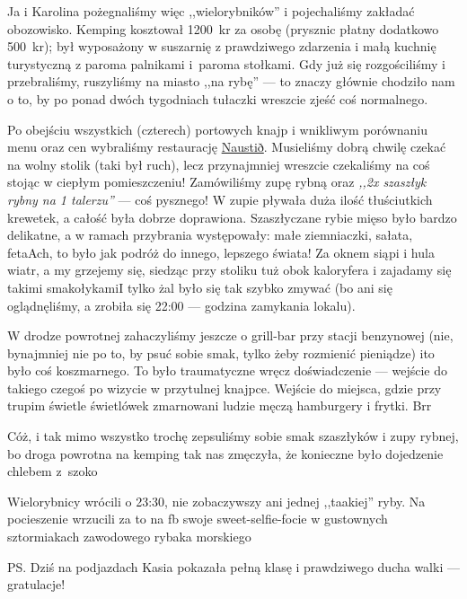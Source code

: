 Ja i Karolina pożegnaliśmy więc ,,wielorybników'' i pojechaliśmy zakładać obozowisko. Kemping kosztował 1200~kr za osobę (prysznic płatny dodatkowo 500~kr); był wyposażony w suszarnię z prawdziwego zdarzenia i małą kuchnię turystyczną z paroma palnikami i~paroma stołkami. Gdy już się rozgościliśmy i przebraliśmy, ruszyliśmy na miasto ,,na rybę'' --- to znaczy głównie chodziło nam o to, by po ponad dwóch tygodniach tułaczki wreszcie zjeść coś normalnego.

Po obejściu wszystkich (czterech) portowych knajp i wnikliwym porównaniu menu oraz cen wybraliśmy restaurację \href{https://www.facebook.com/naustid}{Naustið}. Musieliśmy dobrą chwilę czekać na wolny stolik (taki był ruch), lecz przynajmniej wreszcie czekaliśmy na coś stojąc w ciepłym pomieszczeniu! Zamówiliśmy zupę rybną oraz \emph{,,2x szaszłyk rybny na 1 talerzu''} --- coś pysznego! W zupie pływała duża ilość tłuściutkich krewetek, a całość była dobrze doprawiona. Szaszłyczane rybie mięso było bardzo delikatne, a w ramach przybrania występowały: małe ziemniaczki, sałata, feta\textellipsis Ach, to było jak podróż do innego, lepszego świata! Za oknem siąpi i hula wiatr, a my grzejemy się, siedząc przy stoliku tuż obok kaloryfera i zajadamy się takimi smakołykami\textellipsis I tylko żal było się tak szybko zmywać (bo ani się oglądnęliśmy, a zrobiła się 22:00 --- godzina zamykania lokalu).

W drodze powrotnej zahaczyliśmy jeszcze o grill-bar przy stacji benzynowej (nie, bynajmniej nie po to, by psuć sobie smak, tylko żeby rozmienić pieniądze) i\textellipsis to było coś koszmarnego. To było traumatyczne wręcz doświadczenie --- wejście do takiego czegoś po wizycie w przytulnej knajpce. Wejście do miejsca, gdzie przy trupim świetle świetlówek zmarnowani ludzie męczą hamburgery i frytki. Brr\textellipsis


Cóż, i tak mimo wszystko trochę zepsuliśmy sobie smak szaszłyków i zupy rybnej, bo droga powrotna na kemping tak nas zmęczyła, że konieczne było dojedzenie chlebem z~szoko\textellipsis

Wielorybnicy wrócili o 23:30, nie zobaczywszy ani jednej ,,taakiej'' ryby. Na pocieszenie wrzucili za to na fb swoje sweet-selfie-focie w gustownych sztormiakach zawodowego rybaka morskiego \wink

PS. Dziś na podjazdach Kasia pokazała pełną klasę i prawdziwego ducha walki --- gratulacje!


